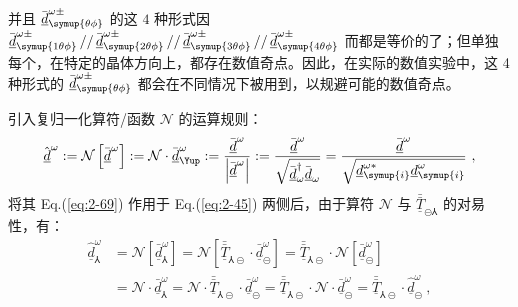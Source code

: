 并且 $\bar{\underline{d}}^{\omega\pm}_{\symup{\theta\phi}}$ 的这 $4$ 种形式因 $\bar{\underline{d}}^{\omega\pm}_{\symup{1\theta\phi}} \mathop{//} \bar{\underline{d}}^{\omega\pm}_{\symup{2\theta\phi}} \mathop{//} \bar{\underline{d}}^{\omega\pm}_{\symup{3\theta\phi}} \mathop{//} \bar{\underline{d}}^{\omega\pm}_{\symup{4\theta\phi}}$ 而都是等价的了；但单独每个，在特定的晶体方向上，都存在数值奇点。因此，在实际的数值实验中，这 4 种形式的 $\bar{\underline{d}}^{\omega\pm}_{\symup{\theta\phi}}$ 都会在不同情况下被用到，以规避可能的数值奇点。

引入复归一化算符/函数 $\mathcal{N}$ 的运算规则：
\begin{equation} \label{eq:2-69}
	\hat{\underline{d}}^{\omega} := \mathcal{N} \left[ \bar{\underline{d}}^{\omega} \right] := \mathcal{N} \cdot \bar{\underline{d}}^{\omega}_{\Yup} := \frac{ \bar{\underline{d}}^{\omega} }{ \left| \bar{\underline{d}}^{\omega} \right| } := \frac{ \bar{\underline{d}}^{\omega} }{ \sqrt{ \bar{\underline{d}}_{\omega}^{\dag} \bar{\underline{d}}_{\omega} } } = \frac{ \bar{\underline{d}}^{\omega} }{ \sqrt{ \underline{d}_{\symup{i}}^{\omega*} \underline{d}_{\symup{i}}^{\omega} } } ~,
\end{equation}
将其 Eq.(\ref{eq:2-69}) 作用于 Eq.(\ref{eq:2-45}) 两侧后，由于算符 $\mathcal{N}$ 与 $\bar{\bar{\underline{T}}}_{\circleddash\Yup}$ 的对易性，有：
\begin{subequations} \label{eq:2-70}
	\begin{align}
		\hat{\underline{d}}^{\omega}_{\Yup} &= \mathcal{N} \left[ \bar{\underline{d}}^{\omega}_{\Yup} \right] = \mathcal{N} \left[ \bar{\bar{\underline{T}}}_{\Yup\circleddash} \cdot \bar{\underline{d}}^{\omega}_{\circleddash} \right] = \bar{\bar{\underline{T}}}_{\Yup\circleddash} \cdot \mathcal{N} \left[ \bar{\underline{d}}^{\omega}_{\circleddash} \right] \label{eq:2-70a}\\ &= \mathcal{N} \cdot \bar{\underline{d}}^{\omega}_{\Yup} = \mathcal{N} \cdot \bar{\bar{\underline{T}}}_{\Yup\circleddash} \cdot \bar{\underline{d}}^{\omega}_{\circleddash} = \bar{\bar{\underline{T}}}_{\Yup\circleddash} \cdot \mathcal{N} \cdot \bar{\underline{d}}^{\omega}_{\circleddash} = \bar{\bar{\underline{T}}}_{\Yup\circleddash} \cdot \hat{\underline{d}}^{\omega}_{\circleddash} \label{eq:2-70b}~,
	\end{align}
\end{subequations}
